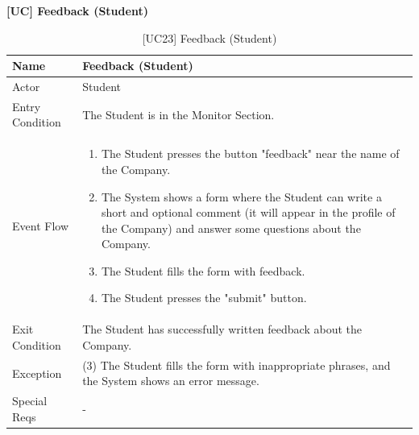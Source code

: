 \textbf{[UC\nextUseCases] Feedback (Student)}
\begin{table}[H] %
    \centering
    \begin{tabular}{|p{3cm}|p{10cm}|}
    \hline
    Name & Feedback (Student) \\ \hline
    Actor  & Student \\ \hline
    Entry Condition  & The Student is in the Monitor Section. \\ \hline
    Event Flow  & 
    \begin{enumerate}[noitemsep, topsep=0pt]
        \item The Student presses the button "feedback" near the name of the Company.
        \item The System shows a form where the Student can write a short and optional comment (it will appear in the profile of the Company) and answer some questions about the Company.
        \item The Student fills the form with feedback.
        \item The Student presses the "submit" button.
    \end{enumerate}
    \\ \hline
    Exit Condition  & The Student has successfully written feedback about the Company. \\ \hline
    Exception  & (3) The Student fills the form with inappropriate phrases, and the System shows an error message. \\ \hline
    Special Reqs  & -  \\ \hline
    \end{tabular}
    \caption{[UC23] Feedback (Student)}
\end{table}


